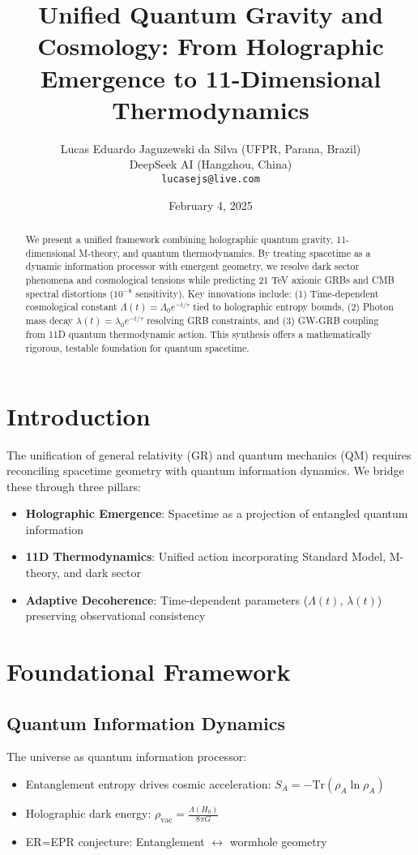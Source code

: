 \documentclass[12pt,a4paper]{article}
\title{Unified Quantum Gravity and Cosmology: From Holographic Emergence to 11-Dimensional Thermodynamics}
\author{
Lucas Eduardo Jaguzewski da Silva (UFPR, Parana, Brazil) \\
DeepSeek AI (Hangzhou, China) \\
\texttt{lucasejs@live.com}
}
\date{February 4, 2025}
\begin{document}
\maketitle

\begin{abstract}
We present a unified framework combining holographic quantum gravity, 11-dimensional M-theory, and quantum thermodynamics. By treating spacetime as a dynamic information processor with emergent geometry, we resolve dark sector phenomena and cosmological tensions while predicting 21 TeV axionic GRBs and CMB spectral distortions ($10^{-8}$ sensitivity). Key innovations include: (1) Time-dependent cosmological constant $\Lambda(t) = \Lambda_0 e^{-t/\tau}$ tied to holographic entropy bounds, (2) Photon mass decay $\lambda(t) = \lambda_0 e^{-t/\tau}$ resolving GRB constraints, and (3) GW-GRB coupling from 11D quantum thermodynamic action. This synthesis offers a mathematically rigorous, testable foundation for quantum spacetime.
\end{abstract}

\section{Introduction}
The unification of general relativity (GR) and quantum mechanics (QM) requires reconciling spacetime geometry with quantum information dynamics. We bridge these through three pillars:

\begin{itemize}
\item \textbf{Holographic Emergence}: Spacetime as a projection of entangled quantum information
\item \textbf{11D Thermodynamics}: Unified action incorporating Standard Model, M-theory, and dark sector
\item \textbf{Adaptive Decoherence}: Time-dependent parameters ($\Lambda(t)$, $\lambda(t)$) preserving observational consistency
\end{itemize}

\section{Foundational Framework}

\subsection{Quantum Information Dynamics}
The universe as quantum information processor:
\begin{itemize}
\item Entanglement entropy drives cosmic acceleration: $S_A = -\text{Tr}(\rho_A \ln\rho_A)$
\item Holographic dark energy: $\rho_{\text{vac}} = \frac{\Lambda(H_0)}{8\pi G}$
\item ER=EPR conjecture: Entanglement $\leftrightarrow$ wormhole geometry
\end{itemize}
\end{document}
